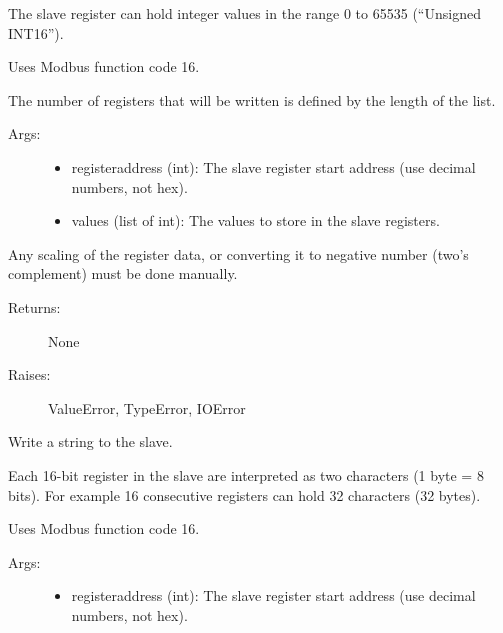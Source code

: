 \documentclass[letterpaper,10pt,english]{sphinxmanual}
\begin{document}
\begin{fulllineitems}
\begin{fulllineitems}
The slave register can hold integer values in the range 0 to 65535 (``Unsigned INT16'').

Uses Modbus function code 16.

The number of registers that will be written is defined by the length of the  list.
\begin{description}
\item[{Args:}] \leavevmode\begin{itemize}
\item {} 
registeraddress (int): The slave register start address (use decimal numbers, not hex).

\item {} 
values (list of int): The values to store in the slave registers.

\end{itemize}

\end{description}

Any scaling of the register data, or converting it to negative number (two's complement)
must be done manually.
\begin{description}
\item[{Returns:}] \leavevmode
None

\item[{Raises:}] \leavevmode
ValueError, TypeError, IOError

\end{description}

\end{fulllineitems}


\begin{fulllineitems}
\label{minimalmodbus:minimalmodbus.Instrument.write_string}
Write a string to the slave.

Each 16-bit register in the slave are interpreted as two characters (1 byte = 8 bits).
For example 16 consecutive registers can hold 32 characters (32 bytes).

Uses Modbus function code 16.
\begin{description}
\item[{Args:}] \leavevmode\begin{itemize}
\item {} 
registeraddress (int): The slave register start address  (use decimal numbers, not hex).


\end{itemize}
\end{description}
\end{fulllineitems}
\end{fulllineitems}
\end{document}
